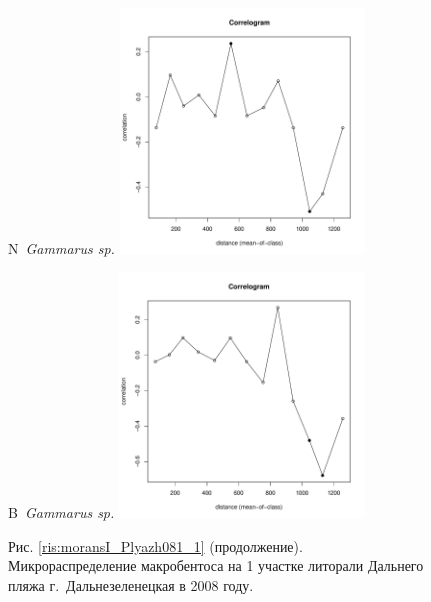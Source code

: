 \documentclass[12pt, a4paper]{disser}
\begin{document}
\begin{figure}[h]
	\begin{minipage}[b]{.46\linewidth}
	\begin{center}
	{\small N~{\it Gammarus sp.}}
		\includegraphics[width=65mm]{../Barenc_Sea/distribution_Moran/Plyazh081_moran_N_Gammarus_sp_.pdf}
	\end{center}
	\end{minipage}
%
	\hfil %
%
	\begin{minipage}[b]{.46\linewidth}
	\begin{center}
	{\small B~{\it Gammarus sp.}}
		\includegraphics[width=65mm]{../Barenc_Sea/distribution_Moran/Plyazh081_moran_B_Gammarus_sp_.pdf}
	\end{center}
	\end{minipage}



	\begin{center}
	Рис. \ref{ris:moransI_Plyazh081_1} (продолжение). Микрораспределение макробентоса на 1 участке литорали Дальнего пляжа г.~Дальнезеленецкая в 2008 году.
	\end{center}

\end{figure}
\end{document}
